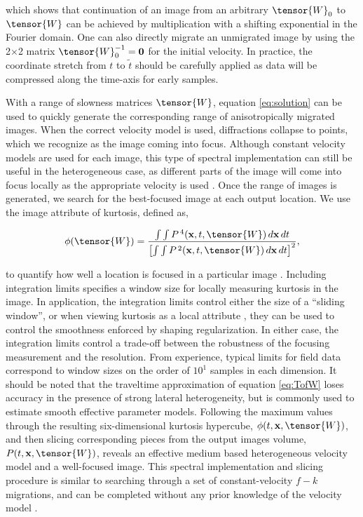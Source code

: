\noindent which shows that continuation of an image from an arbitrary $\tensor{W}_0$ to $\tensor{W}$ can be achieved by multiplication with a shifting exponential in the Fourier domain.  One can also directly migrate an unmigrated image by using the 2$\times $2 matrix $\tensor{W}_0^{-1} = \mathbf{0}$ for the initial velocity.
In practice, the coordinate stretch from $t$ to $\tilde{t}$ should be carefully applied as data will be compressed along the time-axis for early samples. 

With a range of slowness matrices $\tensor{W}$, equation \ref{eq:solution} can be used to quickly generate the corresponding range of anisotropically migrated images.  
When the correct velocity model is used, diffractions collapse to points, which we recognize as the image coming into focus.  
Although constant velocity models are used for each image, this type of spectral implementation can still be useful in the heterogeneous case, as different parts of the image will come into focus locally as the appropriate velocity is used \cite[]{GEO49-11-18691880, SEG-1984-S1.8}.  
Once the range of images is generated, we search for the best-focused image at each output location. We use the image attribute of kurtosis, defined as,

\begin{equation}
\label{eq:kurtosis}
\phi (\tensor{W})=\frac{\int \int P^{\,4}(\mathbf{x},t,\tensor{W})\,d\mathbf{x}\,dt}{\left[\int \int P^{\,2}(\mathbf{x},t,\tensor{W})\,d\mathbf{x}\,dt\right]^2},
\end{equation}

\noindent to quantify how well a location is focused in a particular image \cite[]{wiggins78, fomel_landa_taner07}. 
Including integration limits specifies a window size for locally measuring kurtosis in the image.  
In application, the integration limits control either the size of a ``sliding window'', or when viewing kurtosis as a local attribute \cite[]{fomel07b}, they can be used to control the smoothness enforced by shaping regularization.
In either case, the integration limits control a trade-off between the robustness of the focusing measurement and the resolution.
From experience, typical limits for field data correspond to window sizes on the order of $10^1$ samples in each dimension.
It should be noted that the traveltime approximation of equation \ref{eq:TofW} loses accuracy in the presence of strong lateral heterogeneity, but is commonly used to estimate smooth effective parameter models.
Following the maximum values through the resulting six-dimensional kurtosis hypercube, $\phi (t,\mathbf{x},\tensor{W})$,  and then slicing corresponding pieces from the output images volume, $P(t,\mathbf{x},\tensor{W})$, reveals an effective medium based heterogeneous velocity model and a well-focused image. 
This spectral implementation and slicing procedure is similar to searching through a set of constant-velocity $f-k$ migrations, and can be completed without any prior knowledge of the velocity model \cite[]{SEG-1984-S1.8, GEO57-01-00510059}.  
  



